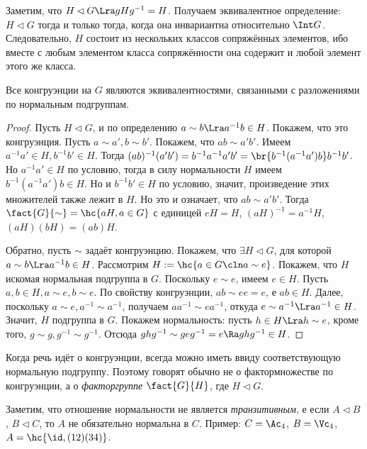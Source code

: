 \documentclass[a4paper]{article}
\begin{document}
Заметим, что $H \lhd G \Lra gHg^{-1}=H$. Получаем эквивалентное определение:  $H\lhd G$ тогда и только тогда,
когда она инвариантна относительно $\Int G$. Следовательно, $H$ состоит из нескольких классов сопряжённых
элементов, ибо вместе с любым элементом класса сопряжённости она содержит и любой элемент этого же класса.

\begin{theorem}
Все конгруэнции на $G$ являются эквивалентностями, связанными с разложениями по нормальным подгруппам.
\end{theorem}
\begin{proof}
 Пусть $H \lhd G$, и по определению $a \sim b \Lra a^{-1}b \in H$. Покажем,  что это конгруэнция. Пусть
$a \sim a', b \sim b'$. Покажем, что $ab \sim a'b'$. Имеем $a^{-1}a' \in H, b^{-1}b' \in H$. Тогда
$(ab)^{-1}(a'b')=b^{-1}a^{-1}a'b'= \br{b^{-1}(a^{-1}a')b}b^{-1}b'$. Но $a^{-1}a' \in H$ по условию, тогда в
силу нормальности $H$ имеем $b^{-1}(a^{-1}a')b \in H$. Но и $b^{-1}b' \in H$ по условию, значит, произведение
этих множителей также лежит в $H$. Но это и означает, что $ab \sim a'b'$. Тогда $\fact{G}{\sim}=\hc{aH, a \in
G}$ с единицей $eH=H$, $(aH)^{-1} = a^{-1}H$, $(aH)(bH)=(ab)H$.

 Обратно, пусть $\sim$ задаёт конгруэнцию. Покажем, что $\exi H \lhd G$,  для которой $a \sim b \Lra
a^{-1}b \in H$. Рассмотрим $H := \hc{a \in G\cln a \sim e}$. Покажем, что $H$ искомая нормальная подгруппа в
$G$. Поскольку $e \sim e$, имеем $e \in H$. Пусть $a,b\in H, a \sim e, b \sim e$. По свойству конгруэнции,
$ab \sim ee=e$, е $ab \in H$. Далее, поскольку $a \sim e, a^{-1} \sim a^{-1}$, получаем $aa^{-1}\sim
ea^{-1}$, откуда $e \sim a^{-1} \Lra a^{-1} \in H$. Значит, $H$ подгруппа в $G$. Покажем нормальность:
пусть $h \in H \Lra h \sim e$, кроме того, $g \sim g, g^{-1} \sim g^{-1}$. Отсюда $ghg^{-1} \sim geg^{-1}=e
\Ra ghg^{-1} \in H$.
\end{proof}

\begin{note}
Когда речь идёт о конгруэнции, всегда можно иметь ввиду соответствующую  нормальную подгруппу. Поэтому
говорят обычно не о фактормножестве по конгруэнции, а о \emph{факторгруппе} $\fact{G}{H}$, где $H \lhd G$.
\end{note}

\begin{note}
Заметим, что отношение нормальности не является \emph{транзитивным}, е если $A \lhd B$, $B \lhd C$, то $A$
не обязательно нормальна в $C$. Пример: $C = \Ac_4$, $B = \Vc_4$, $A= \hc{\id, (12)(34)}$.
\end{note}
\end{document}
